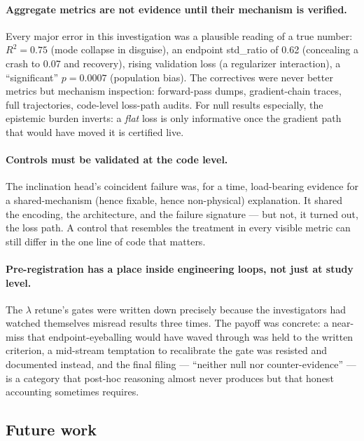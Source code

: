 \documentclass[11pt]{article}
\begin{document}
\paragraph{Aggregate metrics are not evidence until their mechanism is verified.}
Every major error in this investigation was a plausible reading of a true number: $R^2 = 0.75$ (mode collapse in disguise), an endpoint std\_ratio of 0.62 (concealing a crash to 0.07 and recovery), rising validation loss (a regularizer interaction), a ``significant'' $p = 0.0007$ (population bias).
The correctives were never better metrics but mechanism inspection: forward-pass dumps, gradient-chain traces, full trajectories, code-level loss-path audits.
For null results especially, the epistemic burden inverts: a \emph{flat} loss is only informative once the gradient path that would have moved it is certified live.

\paragraph{Controls must be validated at the code level.}
The inclination head's coincident failure was, for a time, load-bearing evidence for a shared-mechanism (hence fixable, hence non-physical) explanation.
It shared the encoding, the architecture, and the failure signature --- but not, it turned out, the loss path.
A control that resembles the treatment in every visible metric can still differ in the one line of code that matters.

\paragraph{Pre-registration has a place inside engineering loops, not just at study level.}
The $\lambda$ retune's gates were written down precisely because the investigators had watched themselves misread results three times.
The payoff was concrete: a near-miss that endpoint-eyeballing would have waved through was held to the written criterion, a mid-stream temptation to recalibrate the gate was resisted and documented instead, and the final filing --- ``neither null nor counter-evidence'' --- is a category that post-hoc reasoning almost never produces but that honest accounting sometimes requires.

\subsection{Future work}
\label{sec:phicpsi:future}
\end{document}
